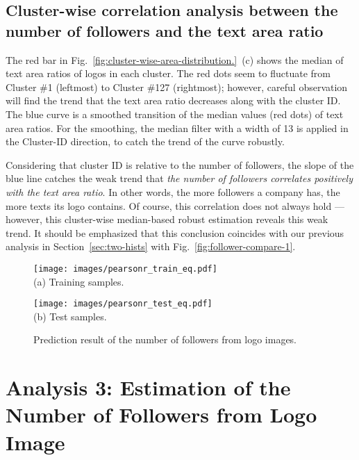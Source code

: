 \documentclass[runningheads]{llncs}
\begin{document}
\subsection{Cluster-wise correlation analysis between the number of followers and the text area ratio\label{sec:correlation}}
The red bar in Fig.~\ref{fig:cluster-wise-area-distribution.}~(c) shows the median of text area ratios of logos in each cluster. The red dots seem to fluctuate from Cluster \#1 (leftmost) to Cluster \#127 (rightmost); however, careful observation will find the trend that the text area ratio decreases along with the cluster ID. The blue curve is a smoothed transition of the median values (red dots) of text area ratios.  For the smoothing, the median filter with a width of 13 is applied in the Cluster-ID direction, to catch the trend of the curve robustly.\par
\par
Considering that cluster ID is relative to the number of followers, the slope of the blue line catches the weak trend that {\em the number of followers correlates positively with the text area ratio}. In other words, the more followers a company has, the more texts its logo contains. Of course, this correlation does not always hold --- however, this cluster-wise median-based robust estimation reveals this weak trend. It should be emphasized that this conclusion coincides with our previous analysis in Section~\ref{sec:two-hists} with Fig.~\ref{fig:follower-compare-1}. 


\begin{figure}[t]
    \centering
    \begin{minipage}{0.45\textwidth}
        \centering
    \texttt{[image: images/pearsonr\_train\_eq.pdf]}\\[-1mm]
    (a) Training samples.
    \end{minipage}
    \begin{minipage}{0.45\textwidth}
        \centering
    \texttt{[image: images/pearsonr\_test\_eq.pdf]}\\[-1mm]
      (b) Test samples.
    \end{minipage}  
    \caption{Prediction result of the number of followers from logo images.}
    \label{fig:regression result}
    \vskip -4mm
\end{figure}
\section{Analysis 3: Estimation of the Number of Followers from Logo Image}
\end{document}
